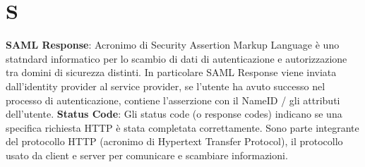 \section{S}
\textbf{SAML Response}: Acronimo di Security Assertion Markup Language è uno statndard informatico per lo scambio di dati di autenticazione e autorizzazione tra domini di sicurezza distinti. In particolare SAML Response viene inviata dall'identity provider al service provider, se l'utente ha avuto successo nel processo di autenticazione, contiene l'asserzione con il NameID / gli attributi dell'utente.
\textbf{Status Code}: Gli status code (o response codes) indicano se una specifica richiesta HTTP è stata completata correttamente. Sono parte integrante del protocollo HTTP (acronimo di Hypertext Transfer Protocol), il protocollo usato da client e server per comunicare e scambiare informazioni.